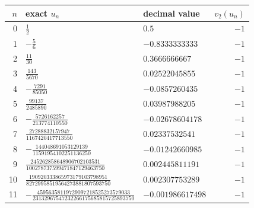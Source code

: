 \begin{tabular}{@{}rllr@{}}
\toprule
$n$ & exact $u_n$ & decimal value & $v_2(u_n)$ \\
\midrule
0 & $\frac{1}{2}$ & $0.5$ & $-1$ \\
1 & $-\frac{5}{6}$ & $-0.8333333333$ & $-1$ \\
2 & $\frac{11}{30}$ & $0.3666666667$ & $-1$ \\
3 & $\frac{143}{5670}$ & $0.02522045855$ & $-1$ \\
4 & $-\frac{7291}{85050}$ & $-0.0857260435$ & $-1$ \\
5 & $\frac{99137}{2485890}$ & $0.03987988205$ & $-1$ \\
6 & $-\frac{5726162257}{213774110550}$ & $-0.02678604178$ & $-1$ \\
7 & $\frac{27288832157947}{1167420417713550}$ & $0.02337532541$ & $-1$ \\
8 & $-\frac{144048691053129139}{11591954102251136250}$ & $-0.01242660985$ & $-1$ \\
9 & $\frac{245262858648906702103531}{100278737599471847129463750}$ & $0.002445811191$ & $-1$ \\
10 & $\frac{190920333865973179103798951}{82729958519564273881807593750}$ & $0.002307753289$ & $-1$ \\
11 & $-\frac{45956358119729097218525273579033}{23132967547232266175685815725893750}$ & $-0.001986617498$ & $-1$ \\
\bottomrule
\end{tabular}
